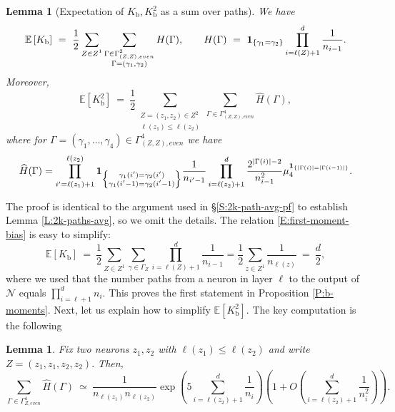 \documentclass[11pt, reqno]{amsart}
\newtheorem{lemma}[theorem]{Lemma}
\newcommand{\E}[1]{{\mathbb E}\left [#1\right]}
\newcommand{\abs}[1]{\ensuremath{\left| #1 \right|}}
\newcommand{\lr}[1]{\ensuremath{\left(#1 \right)}}
\newcommand{\set}[1]{\ensuremath{\{#1\}}}
\newcommand{\mN}{\mathcal N}
\newcommand{\Kb}{K_{\mathrm{b}}}
\begin{document}
\begin{lemma}[Expectation of $\Kb, \Kb^2$ as a sum over paths]\label{L:K-bias-moments}
  We have
  \begin{equation}\label{E:first-moment-bias}
\E{\Kb}~=~\frac{1}{2}\sum_{\substack{Z\in Z^1}}  \sum_{\substack{\Gamma\in \Gamma_{(Z,Z), even}^2\\ \Gamma = \lr{\gamma_1,\gamma_2}}} H(\Gamma),\qquad H(\Gamma)~=~{\bf 1}_{\set{\gamma_1=\gamma_2}} \prod_{i=\ell(Z)+1}^d\frac{1}{n_{i-1}}.
\end{equation}
Moreover, 
\[\E{\Kb^2}~=~\frac{1}{2}\sum_{\substack{Z=(z_1,z_2)\in Z^2\\\ell(z_1)\leq \ell(z_2)}}  \sum_{\Gamma\in \Gamma_{(Z,Z), even}^{4}} \widehat{H}(\Gamma),\]
where for $\Gamma=(\gamma_1,\ldots, \gamma_4)\in  \Gamma_{(Z,Z),even}^{4}$ we have
\begin{equation}\label{E:H-def}
\widehat{H}(\Gamma)=\prod_{i'=\ell(z_1)+1}^{ \ell(z_2)} {\bf 1}_{\left\{\substack{\gamma_1(i')=\gamma_2(i')\\\gamma_1(i'-1)=\gamma_2(i'-1)}\right\}} \frac{1}{n_{i'-1}} \prod_{i=\ell(z_2)+1}^{d} \frac{2^{\abs{\Gamma(i)}-2}}{n_{i-1}^2} \mu_4^{{\bf 1}_{\set{\abs{\Gamma(i)}=\abs{\Gamma(i-1)}}}}.
\end{equation}
\end{lemma}
\noindent The proof is identical to the argument used in \S \ref{S:2k-path-avg-pf} to establish Lemma \ref{L:2k-paths-avg}, so we omit the details. The relation \eqref{E:first-moment-bias} is easy to simplify:
\[\E{\Kb}~=~\frac{1}{2}\sum_{Z\in Z^1}  \sum_{\gamma\in \Gamma_{Z}}\prod_{i=\ell(Z)+1}^d\frac{1}{n_{i-1}} = \frac{1}{2}\sum_{z\in Z^1}  \frac{1}{n_{\ell(z)}}~=~\frac{d}{2},\]
where we used that the number paths from a neuron in layer $\ell$ to the output of $\mN$ equals $\prod_{i=\ell+1}^d n_i$. This proves the first statement in Proposition \ref{P:b-moments}. Next, let us explain how to simplify $\E{\Kb^2}.$ The key computation is the following
\begin{lemma}\label{L:bias-bias-avg}
Fix two neurons $z_1,z_2$ with $\ell(z_1)\leq \ell(z_2)$ and write $Z=(z_1,z_1,z_2,z_2).$ Then, 
\begin{equation}\label{E:H-hat-def}
\sum_{\Gamma\in \Gamma_{Z,even}^{4}} \widehat{H}(\Gamma)~\simeq~\frac{1}{n_{\ell(z_1)}n_{\ell(z_2)}}\exp\lr{5\sum_{i=\ell(z_2)+1}^d\frac{1}{n_i}}\lr{1+O\lr{\sum_{i=\ell(z_2)+1}^d \frac{1}{n_i^2}}}. 
\end{equation}
\end{lemma}
\end{document}
